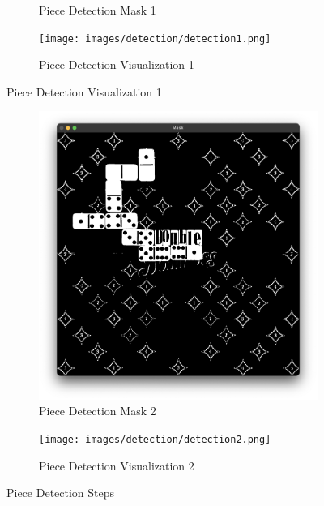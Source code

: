 \documentclass[12pt]{article}
\begin{document}
\begin{itemize}
\begin{figure}[!h]
\begin{subfigure}{.5\textwidth}
                \caption{Piece Detection Mask 1}
                \label{fig:pdm-2}
            \end{subfigure}%
            \begin{subfigure}{.5\textwidth}
                \centering
                \texttt{[image: images/detection/detection1.png]}
                \caption{Piece Detection Visualization 1}
                \label{fig:pdv-1}
            \end{subfigure}
        \end{figure}
        \begin{figure}[!h]
            \ContinuedFloat
            \centering
            \begin{subfigure}{.5\textwidth}
                \centering
                \includegraphics[width=0.9\linewidth]{images/detection/mask2.png}
                \caption{Piece Detection Mask 2}
                \label{fig:pdm-2}
            \end{subfigure}%
            \begin{subfigure}{.5\textwidth}
                \centering
                \texttt{[image: images/detection/detection2.png]}
                \caption{Piece Detection Visualization 2}
                \label{fig:pdv-2}
            \end{subfigure}
            \caption{Piece Detection Steps}
        \end{figure}
    \end{itemize}
\end{document}
